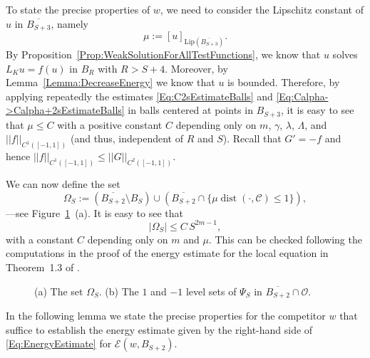 \documentclass[12pt,reqno]{amsart}
\theoremstyle{definition}
\theoremstyle{remark}
\newcommand{\ccal}{\mathscr{C}}
\newcommand{\ecal}{\mathcal{E}}
\newcommand{\ocal}{\mathcal{O}}
\newcommand{\norm}[1]{\left | \left |{#1} \right | \right |}
\newcommand{\seminorm}[1]{\left [ {#1} \right ] }
\newcommand{\s}{\gamma}
\DeclareMathOperator{\dist}{dist}
\numberwithin{equation}{section}
\begin{document}
	To state the precise properties of $w$, we need to consider the Lipschitz constant of $u$ in $\overline{B_{S+3}}$, namely
	\begin{equation} 
	\label{Eq:ChoiceMu} 
	\mu := \seminorm{u}_{\mathrm{Lip}(\overline{B_{S+3}})}. 
	\end{equation} 
	By Proposition~\ref{Prop:WeakSolutionForAllTestFunctions}, we know that $u$ solves $L_K u = f(u)$ in $B_R$ with $R> S+4$. Moreover, by Lemma~\ref{Lemma:DecreaseEnergy} we know that $u$ is bounded. Therefore, by applying repeatedly the estimates \eqref{Eq:C2sEstimateBalls} and \eqref{Eq:Calpha->Calpha+2sEstimateBalls} in balls centered at points in $B_{S+3}$, it is easy to see that $\mu\leq C$ with a positive constant $C$ depending only on $m$, $\s$, $\lambda$, $\Lambda$, and $\norm{f}_{C^1([-1,1])}$ (and thus, independent of $R$ and $S$). Recall that $G' = -f$ and hence $\norm{f}_{C^1([-1,1])} \leq \norm{G}_{C^2([-1,1])}$.
	
	We can now define the set
	\begin{equation}
	\label{Eq:DefOmegaS}
	\Omega_S := \left( \overline{B_{S+2}}\setminus B_S \right) \cup \left(  \overline{B_{S+2}} \cap \{\mu \dist(\cdot,\ccal) \leq 1\}\right),
	\end{equation} 
	---see Figure~\ref{Fig:PsiSandOmegaS}~(a). It is easy to see that 
	\begin{equation}
	\label{Eq:MeasureOmegaS}
	|\Omega_S| \leq C\,S^{2m-1},
	\end{equation}
	with a constant $C$ depending only on $m$ and $\mu$. This can be checked following the computations in the proof of the energy estimate for the local equation in Theorem~1.3 of \cite{CabreTerraI}. 
	
	\begin{figure}
		\centering
		\hspace{-0.26\textwidth} 
		\begin{subfigure}{0.21\textwidth}
			\centering
			
		\end{subfigure}
		\hspace{0.28\textwidth} 
		\begin{subfigure}{0.21\textwidth}
			\centering		
			
		\end{subfigure}
		\caption{(a) The set $\Omega_S$. (b) The $1$ and $-1$ level sets of $\Psi_S$ in $\overline{B_{S+2}}\cap \ocal$.}
		\label{Fig:PsiSandOmegaS}
	\end{figure}
	
	In the following lemma we state the precise properties for the competitor $w$ that suffice to establish the energy estimate given by the right-hand side of \eqref{Eq:EnergyEstimate} for $\ecal(w,B_{S+2})$.
	
\end{document}
